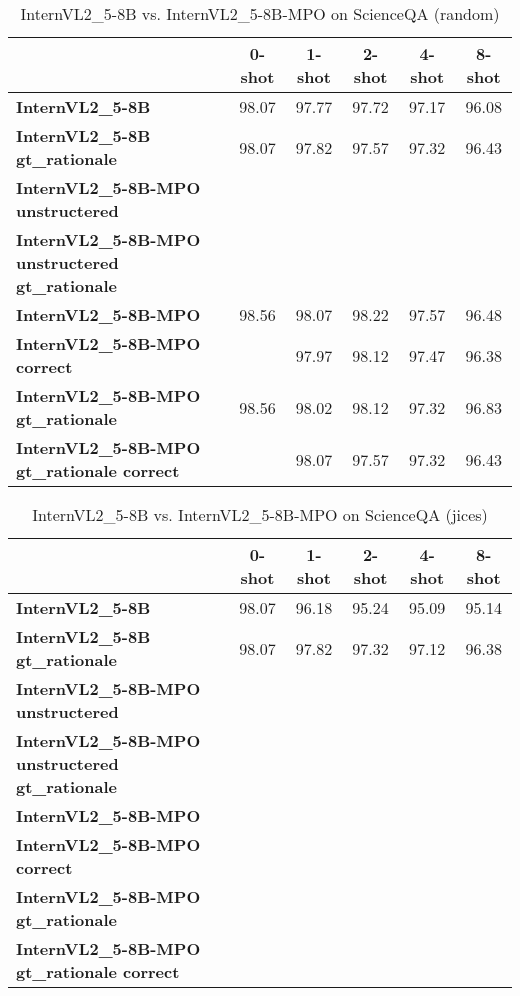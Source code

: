 \begin{table}
\caption{InternVL2\_5-8B vs. InternVL2\_5-8B-MPO on ScienceQA (random)}
\label{tab:InternVL2_5-8B_ScienceQA_TRAIN_random}
\begin{tabular}{lccccc}
\toprule
 & 0-shot & 1-shot & 2-shot & 4-shot & 8-shot \\
\midrule
\textbf{InternVL2\_5-8B} & 98.07 & 97.77 & 97.72 & 97.17 & 96.08 \\
\textbf{InternVL2\_5-8B gt\_rationale} & 98.07 & 97.82 & 97.57 & 97.32 & 96.43 \\
\textbf{InternVL2\_5-8B-MPO unstructered} &  &  &  &  &  \\
\textbf{InternVL2\_5-8B-MPO unstructered gt\_rationale} &  &  &  &  &  \\
\textbf{InternVL2\_5-8B-MPO} & 98.56 & 98.07 & 98.22 & 97.57 & 96.48 \\
\textbf{InternVL2\_5-8B-MPO correct} &  & 97.97 & 98.12 & 97.47 & 96.38 \\
\textbf{InternVL2\_5-8B-MPO gt\_rationale} & 98.56 & 98.02 & 98.12 & 97.32 & 96.83 \\
\textbf{InternVL2\_5-8B-MPO gt\_rationale correct} &  & 98.07 & 97.57 & 97.32 & 96.43 \\
\bottomrule
\end{tabular}
\end{table}


\begin{table}
\caption{InternVL2\_5-8B vs. InternVL2\_5-8B-MPO on ScienceQA (jices)}
\label{tab:InternVL2_5-8B_ScienceQA_TRAIN_jices}
\begin{tabular}{lccccc}
\toprule
 & 0-shot & 1-shot & 2-shot & 4-shot & 8-shot \\
\midrule
\textbf{InternVL2\_5-8B} & 98.07 & 96.18 & 95.24 & 95.09 & 95.14 \\
\textbf{InternVL2\_5-8B gt\_rationale} & 98.07 & 97.82 & 97.32 & 97.12 & 96.38 \\
\textbf{InternVL2\_5-8B-MPO unstructered} &  &  &  &  &  \\
\textbf{InternVL2\_5-8B-MPO unstructered gt\_rationale} &  &  &  &  &  \\
\textbf{InternVL2\_5-8B-MPO} &  &  &  &  &  \\
\textbf{InternVL2\_5-8B-MPO correct} &  &  &  &  &  \\
\textbf{InternVL2\_5-8B-MPO gt\_rationale} &  &  &  &  &  \\
\textbf{InternVL2\_5-8B-MPO gt\_rationale correct} &  &  &  &  &  \\
\bottomrule
\end{tabular}
\end{table}


